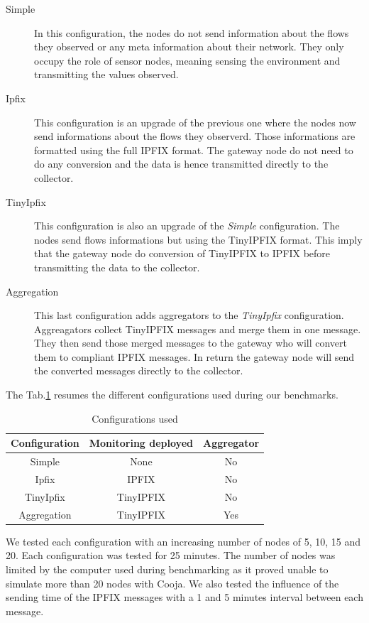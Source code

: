 \begin{description}
  \item[Simple] In this configuration, the nodes do not send information about the flows they observed or any meta information about their network. They only occupy the role of sensor nodes, meaning sensing the environment and transmitting the values observed.
  \item[Ipfix] This configuration is an upgrade of the previous one where the nodes now send informations about the flows they observerd. Those informations are formatted using the full IPFIX format. The gateway node do not need to do any conversion and the data is hence transmitted directly to the collector.
  \item[TinyIpfix] This configuration is also an upgrade of the \textit{Simple} configuration. The nodes send flows informations but using the TinyIPFIX format. This imply that the gateway node do conversion of TinyIPFIX to IPFIX before transmitting the data to the collector.
  \item[Aggregation] This last configuration adds aggregators to the \textit{TinyIpfix} configuration. Aggreagators collect TinyIPFIX messages and merge them in one message. They then send those merged messages to the gateway who will convert them to compliant IPFIX messages. In return the gateway node will send the converted messages directly to the collector. \\
\end{description}

The Tab.\ref{table:configurations} resumes the different configurations used during our benchmarks. \\

\begin{table}
  \centering
  \begin{tabular}{|c|c|c|}
    \hline
    Configuration & Monitoring deployed & Aggregator \\
    \hline
    Simple & None & No \\
    \hline
    Ipfix & IPFIX & No \\
    \hline
    TinyIpfix & TinyIPFIX & No \\
    \hline
    Aggregation & TinyIPFIX & Yes \\
    \hline
  \end{tabular}
  \caption{Configurations used}
  \label{table:configurations}
\end{table}

We tested each configuration with an increasing number of nodes of 5, 10, 15 and 20. Each configuration was tested for 25 minutes. The number of nodes was limited by the computer used during benchmarking as it proved unable to simulate more than 20 nodes with Cooja. We also tested the influence of the sending time of the IPFIX messages with a 1 and 5 minutes interval between each message.\\

